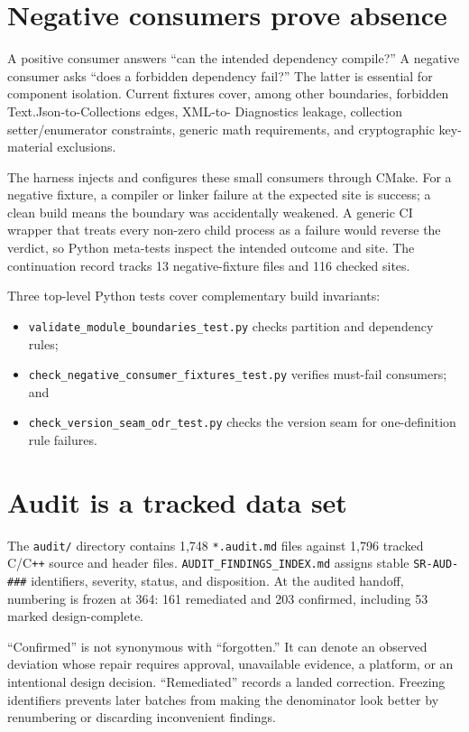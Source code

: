\section{Negative consumers prove absence}

A positive consumer answers ``can the intended dependency compile?'' A negative consumer asks
``does a forbidden dependency fail?'' The latter is essential for component isolation. Current
fixtures cover, among other boundaries, forbidden Text.Json-to-Collections edges, XML-to-
Diagnostics leakage, collection setter/enumerator constraints, generic math requirements, and
cryptographic key-material exclusions.

The harness injects and configures these small consumers through CMake. For a negative fixture,
a compiler or linker failure at the expected site is success; a clean build means the boundary
was accidentally weakened. A generic CI wrapper that treats every non-zero child process as a
failure would reverse the verdict, so Python meta-tests inspect the intended outcome and site.
The continuation record tracks 13 negative-fixture files and 116 checked sites.

Three top-level Python tests cover complementary build invariants:

\begin{itemize}
  \item \texttt{validate\_module\_boundaries\_test.py} checks partition and dependency rules;
  \item \texttt{check\_negative\_consumer\_fixtures\_test.py} verifies must-fail consumers; and
  \item \texttt{check\_version\_seam\_odr\_test.py} checks the version seam for one-definition
        rule failures.
\end{itemize}

\section{Audit is a tracked data set}

The \texttt{audit/} directory contains 1{,}748 \texttt{*.audit.md} files against 1{,}796
tracked C/C\texttt{++} source and header files. \texttt{AUDIT\_FINDINGS\_INDEX.md} assigns
stable \texttt{SR-AUD-\#\#\#} identifiers, severity, status, and disposition. At the audited
handoff, numbering is frozen at 364: 161 remediated and 203 confirmed, including 53 marked
design-complete.

``Confirmed'' is not synonymous with ``forgotten.'' It can denote an observed deviation whose
repair requires approval, unavailable evidence, a platform, or an intentional design decision.
``Remediated'' records a landed correction. Freezing identifiers prevents later batches from
making the denominator look better by renumbering or discarding inconvenient findings.

